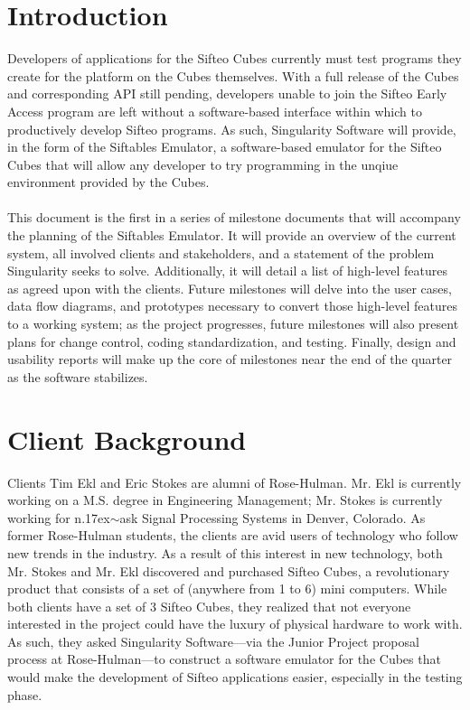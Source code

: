 \documentclass[12pt]{article}
\begin{document}
\section{Introduction}
Developers of applications for the \gls{Sifteo Cubes} currently must test programs they create for the platform on the Cubes themselves.  With a full release of the Cubes and corresponding \gls{API} still pending, developers unable to join the Sifteo Early Access program are left without a software-based interface within which to productively develop Sifteo programs. As such, Singularity Software will provide, in the form of the Siftables Emulator, a software-based emulator for the Sifteo Cubes that will allow any developer to try programming in the unqiue environment provided by the Cubes.\\\\
This document is the first in a series of milestone documents that will accompany the planning of the Siftables Emulator. It will provide an overview of the current system, all involved clients and stakeholders, and a statement of the problem Singularity seeks to solve. Additionally, it will detail a list of high-level features as agreed upon with the clients. Future milestones will delve into the user cases, data flow diagrams, and prototypes necessary to convert those high-level features to a working system; as the project progresses, future milestones will also present plans for change control, coding standardization, and testing. Finally, design and usability reports will make up the core of milestones near the end of the quarter as the software stabilizes.

\section{Client Background}
Clients Tim Ekl and Eric Stokes are alumni of Rose-Hulman. Mr. Ekl is currently working on a M.S. degree in Engineering Management; Mr. Stokes is currently working for n{\raise.17ex\hbox{$\scriptstyle\sim$}}ask Signal Processing Systems in Denver, Colorado. As former Rose-Hulman students, the clients are avid users of technology who follow new trends in the industry. As a result of this interest in new technology, both Mr. Stokes and Mr. Ekl discovered and purchased Sifteo Cubes, a revolutionary product that consists of a set of (anywhere from 1 to 6) mini computers. While both clients have a set of 3 Sifteo Cubes, they realized that not everyone interested in the project could have the luxury of physical hardware to work with. As such, they asked Singularity Software---via the Junior Project proposal process at Rose-Hulman---to construct a software emulator for the Cubes that would make the development of Sifteo applications easier, especially in the testing phase.
\end{document}
